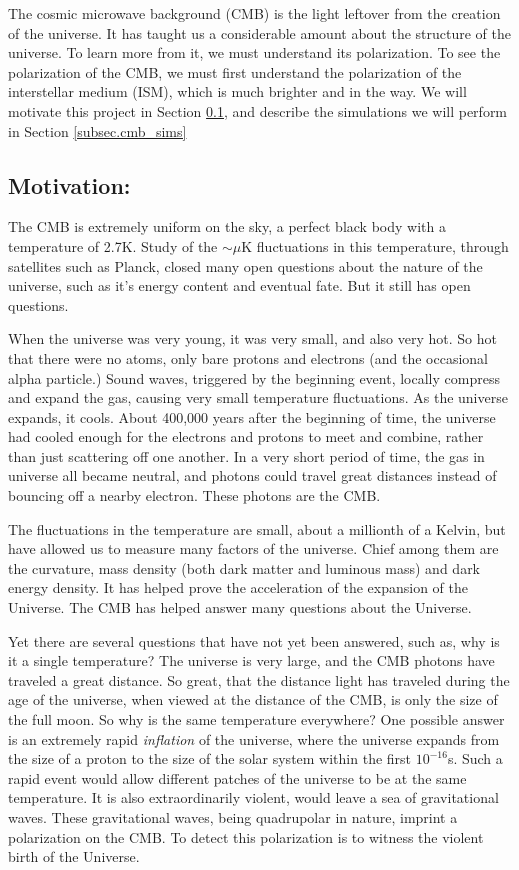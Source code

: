 The cosmic microwave background (CMB) is the light leftover from the creation of
the universe.  It has taught us a considerable amount about the structure of the
universe.  To learn more from it, we must understand its polarization.  To see
the polarization of the CMB, we must first understand the polarization of the
interstellar medium (ISM), which is much brighter and in the way.  We will
motivate this project in Section \ref{subsec.cmb_motivate}, and describe the
simulations we will perform in Section \ref{subsec.cmb_sims}

\subsection{Motivation: \nameCMB}
\label{subsec.cmb_motivate}

The CMB is extremely uniform on the sky, a perfect black body with a
temperature of 2.7K. Study of the $\sim \mu$K fluctuations in this temperature, through satellites such as Planck, closed many open
questions about the nature of the universe, such as it's energy content and
eventual fate.  But it still has open questions.

When the universe was very young, it was very small, and also very hot.  So hot
that there were no atoms, only bare protons and electrons (and the occasional
alpha particle.)  Sound waves, triggered by the
beginning event, locally compress and expand the gas, causing very small
temperature fluctuations.  As the universe expands, it cools.  About 400,000
years after the beginning of time, the universe had cooled enough for the electrons and
protons to meet and combine, rather than just scattering off one another.  In a
very short period of time, the gas in universe all became neutral, and photons could
travel great distances instead of bouncing off a nearby electron.  These photons
are the CMB.

The fluctuations in the temperature are small, about a millionth of a Kelvin,
but have allowed us to measure many factors of the universe.  Chief among them
are the curvature, mass density (both dark matter and luminous mass) and dark energy
density.  It has helped prove the acceleration of the expansion of the Universe.
The CMB has helped answer many questions about the Universe.

Yet there are several questions that
have not yet been answered, such as, why is it a single temperature?  The
universe is very large, and the CMB photons have traveled a great distance.  So
great, that the distance light has traveled during the age of the universe, when
viewed at the distance of the CMB, is only the size of the full moon.  So why is
the same temperature everywhere?  One possible answer is an extremely rapid
\emph{inflation} of the universe, where the universe expands from the size of a
proton to the size of the solar system within the first $10^{-16}$s.  Such a
rapid event would allow different patches of the universe to be at the same
temperature.  
It is also extraordinarily violent, would leave a sea of gravitational waves.  These gravitational
waves, being quadrupolar in nature, imprint a polarization on the CMB. To detect
this polarization is to witness the violent birth of the Universe.

